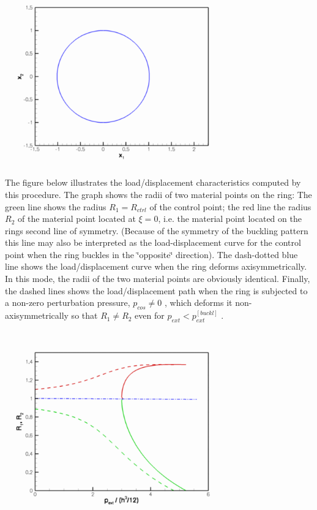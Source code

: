  
\begin{DoxyImage}
\includegraphics[width=0.75\textwidth]{ring}
\end{DoxyImage}


The figure below illustrates the load/displacement characteristics computed by this procedure. The graph shows the radii of two material points on the ring\+: The green line shows the radius $ R_1 = R_{ctrl} $ of the control point; the red line the radius $ R_2 $ of the material point located at $ \xi = 0$, i.\+e. the material point located on the ring\textquotesingle{}s second line of symmetry. (Because of the symmetry of the buckling pattern this line may also be interpreted as the load-\/displacement curve for the control point when the ring buckles in the \char`\"{}opposite\char`\"{} direction). The dash-\/dotted blue line shows the load/displacement curve when the ring deforms axisymmetrically. In this mode, the radii of the two material points are obviously identical. Finally, the dashed lines shows the load/displacement path when the ring is subjected to a non-\/zero perturbation pressure, $ p_{cos} \ne 0$ , which deforms it non-\/axisymmetrically so that $ R_1 \ne R_2 $ even for $ p_{ext} < p_{ext}^{[buckl]}$ .

 
\begin{DoxyImage}
\includegraphics[width=0.75\textwidth]{trace}
\end{DoxyImage}


